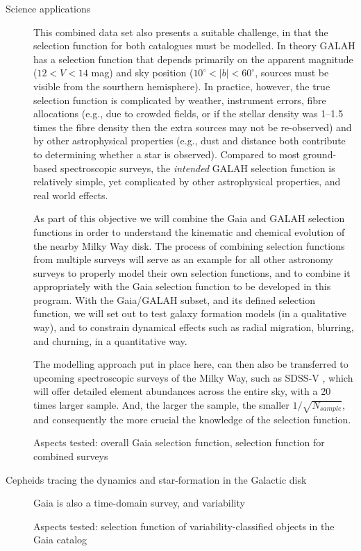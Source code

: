 \begin{workpackage}{Science applications}
\begin{wpobjectives}
\begin{description}
{        This combined data set also presents a suitable challenge, in that the selection function for both catalogues must be modelled. In theory GALAH has a selection function that depends primarily on the apparent magnitude ($12 < V <14$ mag) and sky position ($10^\circ < |b| < 60^\circ$, sources must be visible from the sourthern hemisphere). In practice, however, the true selection function is complicated by weather, instrument errors, fibre allocations (e.g., due to crowded fields, or if the stellar density was 1--1.5 times the fibre density then the extra sources may not be re-observed) and by other astrophysical properties (e.g., dust and distance both contribute to determining whether a star is observed). Compared to most ground-based spectroscopic surveys, the \emph{intended} GALAH selection function is relatively simple, yet complicated by other astrophysical properties, and real world effects.
      
        As part of this objective we will combine the Gaia and GALAH selection functions in order to understand the kinematic and chemical evolution of the nearby Milky Way disk. The process of combining selection functions from multiple surveys will serve as an example for all other astronomy surveys to properly model their own selection functions, and to combine it appropriately with the Gaia selection function to be developed in this program. With the Gaia/GALAH subset, and its defined selection function, we will set out to test galaxy formation models (in a qualitative way), and to constrain dynamical effects such as radial migration, blurring, and churning, in a quantitative way. 
        
        The modelling approach put in place here, can then also be transferred to upcoming spectroscopic surveys of the Milky Way, such as SDSS-V \citep{SDSS-V}, which will offer detailed element abundances across the entire sky, with a 20 times larger sample. And, the larger the sample, the smaller $1/\sqrt{N_{sample}}$, and consequently the more crucial the knowledge of the selection function. 
        
        \textsf{Aspects tested: overall Gaia selection function, selection function for combined surveys}
     }
     
     \item[Cepheids tracing the dynamics and star-formation in the Galactic disk]
        {Gaia is also a time-domain survey, and variability
        
        \textsf{Aspects tested: selection function of variability-classified objects in the Gaia catalog}
     }
    \end{description}
  \end{wpobjectives}


\end{workpackage}
